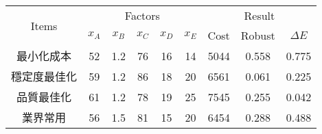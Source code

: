 \begin{tabular}{ccccccccc}
\hline
\multirow{2}{*}{Items} &
\multicolumn{5}{c}{Factors} &
\multicolumn{3}{c}{\multirow{1}{*}{Result}} \\
\cline{2-9}
  & $x_A$ & $x_B$ & $x_C$ & $x_D$ & $x_E$ & Cost & Robust & $\Delta E$ \\
\hline\hline
最小化成本 & 52 & 1.2 & 76 & 16 & 14 & 5044 & 0.558 & 0.775 \\ 
穩定度最佳化 & 59 & 1.2 & 86 & 18 & 20 & 6561 & 0.061 & 0.225 \\ 
品質最佳化 & 61 & 1.2 & 78 & 19 & 25 & 7545 & 0.255 & 0.042 \\ 
業界常用 & 56 & 1.5 & 81 & 15 & 20 & 6454 & 0.288 & 0.488 \\
\hline
\end{tabular}